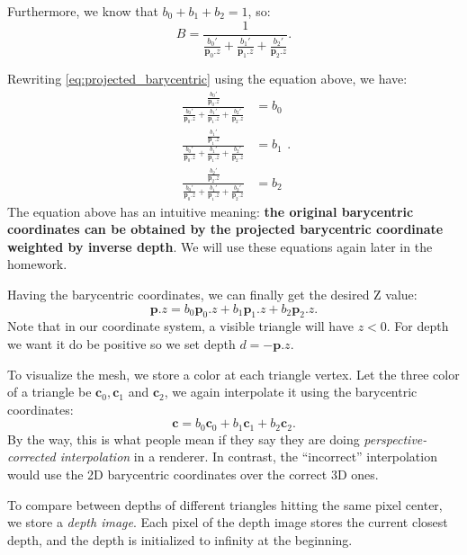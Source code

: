Furthermore, we know that $b_0 + b_1 + b_2 = 1$, so:
\begin{equation}
B = \frac{1}{\frac{b_0'}{\mathbf{p}_0.z} + \frac{b_1'}{\mathbf{p}_1.z} + \frac{b_2'}{\mathbf{p}_2.z}}.
\end{equation}

Rewriting \cref{eq:projected_barycentric} using the equation above, we have:
\begin{equation}
\begin{aligned}
\frac{\frac{b_0'}{\mathbf{p}_0.z}}{\frac{b_0'}{\mathbf{p}_0.z} + \frac{b_1'}{\mathbf{p}_1.z} + \frac{b_2'}{\mathbf{p}_2.z}} &= b_0 \\
\frac{\frac{b_1'}{\mathbf{p}_1.z}}{\frac{b_0'}{\mathbf{p}_0.z} + \frac{b_1'}{\mathbf{p}_1.z} + \frac{b_2'}{\mathbf{p}_2.z}} &= b_1 \\
\frac{\frac{b_2'}{\mathbf{p}_2.z}}{\frac{b_0'}{\mathbf{p}_0.z} + \frac{b_1'}{\mathbf{p}_1.z} + \frac{b_2'}{\mathbf{p}_2.z}} &= b_2
\end{aligned}.
\label{eq:inverse_depth_weighting}
\end{equation}
The equation above has an intuitive meaning: \textbf{the original barycentric coordinates can be obtained by the projected barycentric coordinate weighted by inverse depth}. We will use these equations again later in the homework.

Having the barycentric coordinates, we can finally get the desired Z value:
\begin{equation}
\mathbf{p}.z = b_0 \mathbf{p}_0.z + b_1 \mathbf{p}_1.z + b_2 \mathbf{p}_2.z.
\label{eq:interpolated_depth}
\end{equation}
Note that in our coordinate system, a visible triangle will have $z < 0$. For depth we want it do be positive so we set depth $d = -\mathbf{p}.z$.

To visualize the mesh, we store a color at each triangle vertex. Let the three color of a triangle be $\mathbf{c}_0, \mathbf{c}_1$ and $\mathbf{c}_2$, we again interpolate it using the barycentric coordinates:
\begin{equation}
\mathbf{c} = b_0 \mathbf{c}_0 + b_1 \mathbf{c}_1 + b_2 \mathbf{c}_2.
\label{eq:interpolated_color}
\end{equation}
By the way, this is what people mean if they say they are doing \emph{perspective-corrected interpolation} in a renderer. In contrast, the ``incorrect'' interpolation would use the 2D barycentric coordinates over the correct 3D ones.

To compare between depths of different triangles hitting the same pixel center, we store a \emph{depth image}. Each pixel of the depth image stores the current closest depth, and the depth is initialized to infinity at the beginning. 

